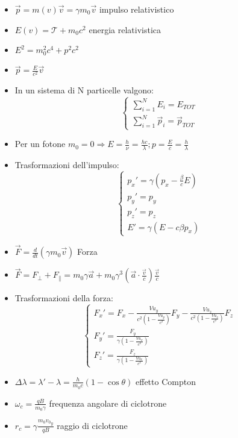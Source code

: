 \documentclass[a4paper]{article}
\begin{document}
        \begin{itemize}
            \item $\vec{p}=m(v)\vec{v}=\gamma m_0\vec{v}$ impulso relativistico
            \item $E(v)=\mathcal{T}+m_0c^2$ energia relativistica
            \item $E^2=m_0^2c^4+p^2c^2$
            \item $\vec{p}=\frac{E}{c^2}\vec{v}$
            \item In un sistema di N particelle valgono:\\
                $$\begin{cases}
                    \sum_{i=1}^{N}E_i=E_{TOT}\\
                    \sum_{i=1}^{N}\vec{p}_i=\vec{p}_{TOT}
                \end{cases}$$
            \item Per un fotone $m_0=0\Rightarrow E=\frac{h}{\nu}=\frac{hc}{\lambda}; p=\frac{E}{c}=\frac{h}{\lambda}$ 
            \item Trasformazioni dell'impulso:\\
                $$\begin{cases}
                    p_x'=\gamma\left(p_x-\frac{\beta}{c}E\right)\\
                    p_y'=p_y\\
                    p_z'=p_z\\
                    E'=\gamma(E-c\beta p_x)
                \end{cases}$$
            \item $\vec{F}=\frac{d}{dt}(\gamma m_0\vec{v})$ Forza
            \item $\vec{F}=F_\perp+F_\|=m_0\gamma\vec{a}+m_0\gamma^3\left(\vec{a}\cdot\frac{\vec{v}}{c}\right)\frac{\vec{v}}{c}$
            \item Trasformazioni della forza:\\
                $$\begin{cases}
                    F_x'=F_x-\frac{Vu_y}{c^2\left(1-\frac{Vu_y}{c^2}\right)}F_y-\frac{Vu_z}{c^2\left(1-\frac{Vu_z}{c^2}\right)}F_z\\
                    F_y'=\frac{F_y}{\gamma\left(1-\frac{Vu_x}{c^2}\right)}\\
                    F_z'=\frac{F_z}{\gamma\left(1-\frac{Vu_x}{c^2}\right)}
                \end{cases}$$
            \item $\Delta\lambda=\lambda'-\lambda=\frac{h}{m_0c}(1-\cos{\theta})$ effetto Compton
            \item $\omega_c=\frac{qB}{m_0\gamma}$ frequenza angolare di ciclotrone
            \item $r_c=\gamma\frac{m_0{v_0}_y}{qB}$ raggio di ciclotrone
        \end{itemize}
\end{document}
